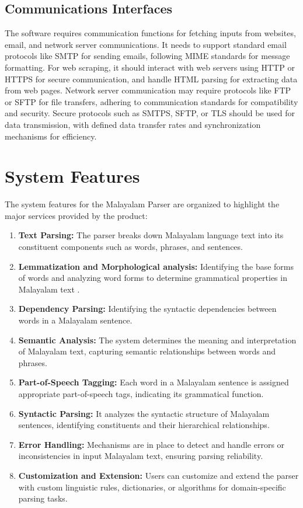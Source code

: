 \documentclass[12pt]{article}
\begin{document}
	\subsection{Communications Interfaces}
	The software requires communication functions for fetching inputs from websites, email,
	and network server communications. It needs to support standard email protocols like
	SMTP for sending emails, following MIME standards for message formatting. For web
	scraping, it should interact with web servers using HTTP or HTTPS for secure
	communication, and handle HTML parsing for extracting data from web pages. Network
	server communication may require protocols like FTP or SFTP for file transfers, adhering
	to communication standards for compatibility and security. Secure protocols such as
	SMTPS, SFTP, or TLS should be used for data transmission, with defined data transfer
	rates and synchronization mechanisms for efficiency.
	
	\section{System Features}
	The system features for the Malayalam Parser are organized to highlight the major services provided by the product:
	\begin{enumerate}
		\item \textbf{Text Parsing:} The parser breaks down Malayalam language text into its constituent
		components such as words, phrases, and sentences.
		\item \textbf{Lemmatization and Morphological analysis:} Identifying the base forms of words
		and analyzing word forms to determine grammatical properties in Malayalam text .
		\item \textbf{Dependency Parsing:} Identifying the syntactic dependencies between words in a
		Malayalam sentence.
		\item \textbf{Semantic Analysis:} The system determines the meaning and interpretation of
		Malayalam text, capturing semantic relationships between words and phrases.
		\item \textbf{Part-of-Speech Tagging:} Each word in a Malayalam sentence is assigned
		appropriate part-of-speech tags, indicating its grammatical function.
		\item \textbf{Syntactic Parsing:} It analyzes the syntactic structure of Malayalam sentences,
		identifying constituents and their hierarchical relationships.
		\item \textbf{Error Handling:} Mechanisms are in place to detect and handle errors or
		inconsistencies in input Malayalam text, ensuring parsing reliability.
		\item \textbf{Customization and Extension:} Users can customize and extend the parser with
		custom linguistic rules, dictionaries, or algorithms for domain-specific parsing tasks.
	\end{enumerate}
\end{document}
